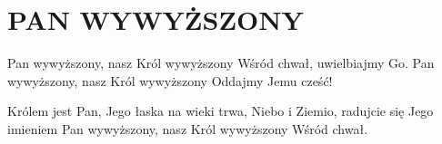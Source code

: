 \documentclass[../../../songbook.tex]{subfiles}
\begin{document}
\TabPositions{8cm} %
\section*{PAN WYWYŻSZONY}
{}
\vspace{0.5cm}
Pan wywyższony, nasz Król wywyższony	 \newline	 
Wśród chwał, uwielbiajmy Go.			 \newline
Pan wywyższony, nasz Król wywyższony	 \newline	
Oddajmy Jemu cześć!   					 \newline	

Królem jest Pan, Jego łaska na wieki trwa,	 \newline	
Niebo i Ziemio, radujcie się Jego imieniem	 \newline	
Pan wywyższony, nasz Król wywyższony		 \newline	
Wśród chwał.    							 \newline	
\end{document}
